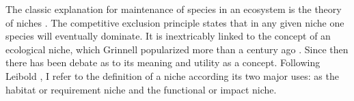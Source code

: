 The classic explanation for maintenance of species in an ecosystem is the theory of niches \cite{Leibold1995,Chesson2000}. 
The competitive exclusion principle states that in any given niche one species will eventually dominate. %
It is inextricably linked to the concept of an ecological niche, which Grinnell popularized more than a century ago \cite{Grinnell1917}. 
Since then there has been debate as to its meaning and utility as a concept. 
Following Leibold \cite{Leibold1995}, I refer to the definition of a niche according its two major uses: as the habitat or requirement niche and the functional or impact niche.

